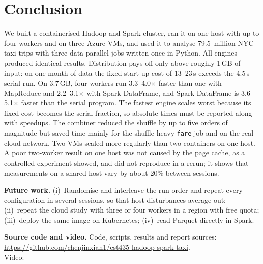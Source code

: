 \section{Conclusion}\label{sec:conclusion}
We built a containerised Hadoop and Spark cluster, ran it on one host with up to four
workers and on three Azure VMs, and used it to analyse 79.5~million NYC taxi trips
with three data-parallel jobs written once in Python. All engines produced identical
results. Distribution pays off only above roughly 1\,GB of input: on one month of data
the fixed start-up cost of 13--23\,s exceeds the 4.5\,s serial run. On 3.7\,GB, four
workers run 3.3--4.0$\times$ faster than one with MapReduce and 2.2--3.1$\times$ with
Spark DataFrame, and Spark DataFrame is 3.6--5.1$\times$ faster than the serial
program. The fastest engine scales worst because its fixed cost becomes the serial
fraction, so absolute times must be reported along with speedups. The combiner
reduced the shuffle by up to five orders of magnitude but saved time mainly for the
shuffle-heavy \texttt{fare} job and on the real cloud network. Two VMs scaled more
regularly than two containers on one host. A poor two-worker result on one host was
not caused by the page cache, as a controlled experiment showed, and did not reproduce
in a rerun; it shows that measurements on a shared host vary by about 20\% between
sessions.

\textbf{Future work.} (i)~Randomise and interleave the run order and repeat every
configuration in several sessions, so that host disturbances average out;
(ii)~repeat the cloud study with three or four workers in a region with free quota;
(iii)~deploy the same image on Kubernetes; (iv)~read Parquet directly in Spark.

\medskip
{\raggedright\noindent\textbf{Source code and video.} Code, scripts, results and
report sources: \url{https://github.com/chenjinxian1/cst435-hadoop-spark-taxi}.\\
Video: \par}
